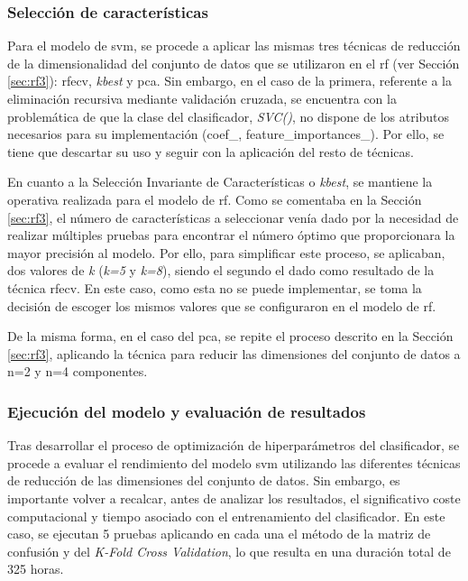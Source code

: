 \clearpage

\subsubsection{Selección de características}
\label{sec:svm3}

Para el modelo de \gls{svm}, se procede a aplicar las mismas tres técnicas de reducción de la dimensionalidad del conjunto de datos que se utilizaron en el \gls{rf} (ver Sección \ref{sec:rf3}): \gls{rfecv}, \textit{kbest} y \gls{pca}. Sin embargo, en el caso de la primera, referente a la eliminación recursiva mediante validación cruzada, se encuentra con la problemática de que la clase del clasificador, \textit{SVC()}, no dispone de los atributos necesarios para su implementación (coef\_,  feature\_importances\_). Por ello, se tiene que descartar su uso y seguir con la aplicación del resto de técnicas.

\vspace{3mm}

En cuanto a la Selección Invariante de Características o \textit{kbest}, se mantiene la operativa realizada para el modelo de \gls{rf}. Como se comentaba en la Sección \ref{sec:rf3}, el número de características a seleccionar venía dado por la necesidad de realizar múltiples pruebas para encontrar el número óptimo que proporcionara la mayor precisión al modelo. Por ello, para simplificar este proceso, se aplicaban, dos valores de \textit{k} (\textit{k=5} y \textit{k=8}), siendo el segundo el dado como resultado de la técnica \gls{rfecv}. En este caso, como esta no se puede implementar, se toma la decisión de escoger los mismos valores que se configuraron en el modelo de \gls{rf}.

\vspace{3mm}

De la misma forma, en el caso del \gls{pca}, se repite el proceso descrito en la Sección \ref{sec:rf3}, aplicando la técnica para reducir las dimensiones del conjunto de datos a n=2 y n=4 componentes. 

\subsubsection{Ejecución del modelo y evaluación de resultados}
\label{sec:svm4}

Tras desarrollar el proceso de optimización de hiperparámetros del clasificador, se procede a evaluar el rendimiento del modelo \gls{svm} utilizando las diferentes técnicas de reducción de las dimensiones del conjunto de datos. Sin embargo, es importante volver a recalcar, antes de analizar los resultados, el significativo coste computacional y tiempo asociado con el entrenamiento del clasificador. En este caso, se ejecutan 5 pruebas aplicando en cada una el método de la matriz de confusión y del \textit{K-Fold Cross Validation}, lo que resulta en una duración total de 325 horas.

